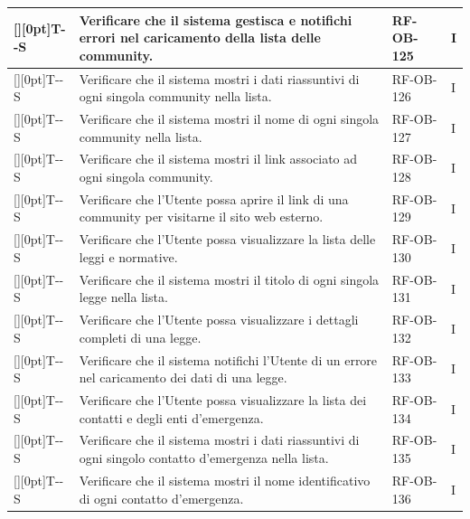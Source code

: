 \documentclass[a4paper,12pt]{article}
\newcounter{testsys}
\newcommand{\systestcode}{%
  \raisebox{0pt}[\height][0pt]{\hypertarget{T-\arabic{testsys}-S}{}}T-\arabic{testsys}-S%
}
\begin{document}
\begin{longtable}{| >{\centering\arraybackslash}p{} | >{\raggedright\arraybackslash}p{} | >{\centering\arraybackslash}p{} | >{\centering\arraybackslash}p{} |}
\stepcounter{testsys} \systestcode & Verificare che il sistema gestisca e notifichi errori nel caricamento della lista delle community. & RF-OB-125 & I \\
\hline

\stepcounter{testsys} \systestcode & Verificare che il sistema mostri i dati riassuntivi di ogni singola community nella lista. & RF-OB-126 & I \\
\hline

\stepcounter{testsys} \systestcode & Verificare che il sistema mostri il nome di ogni singola community nella lista. & RF-OB-127 & I \\
\hline

\stepcounter{testsys} \systestcode & Verificare che il sistema mostri il link associato ad ogni singola community. & RF-OB-128 & I \\
\hline

\stepcounter{testsys} \systestcode & Verificare che l'Utente possa aprire il link di una community per visitarne il sito web esterno. & RF-OB-129 & I \\
\hline

\stepcounter{testsys} \systestcode & Verificare che l'Utente possa visualizzare la lista delle leggi e normative. & RF-OB-130 & I \\
\hline

\stepcounter{testsys} \systestcode & Verificare che il sistema mostri il titolo di ogni singola legge nella lista. & RF-OB-131 & I \\
\hline

\stepcounter{testsys} \systestcode & Verificare che l'Utente possa visualizzare i dettagli completi di una legge. & RF-OB-132 & I \\
\hline

\stepcounter{testsys} \systestcode & Verificare che il sistema notifichi l'Utente di un errore nel caricamento dei dati di una legge. & RF-OB-133 & I \\
\hline

\stepcounter{testsys} \systestcode & Verificare che l'Utente possa visualizzare la lista dei contatti e degli enti d'emergenza. & RF-OB-134 & I \\
\hline

\stepcounter{testsys} \systestcode & Verificare che il sistema mostri i dati riassuntivi di ogni singolo contatto d'emergenza nella lista. & RF-OB-135 & I \\
\hline

\stepcounter{testsys} \systestcode & Verificare che il sistema mostri il nome identificativo di ogni contatto d'emergenza. & RF-OB-136 & I \\
\hline


\end{longtable}
\end{document}
